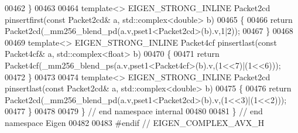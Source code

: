 \begin{DoxyCode}
00462 \}
00463 
00464 \textcolor{keyword}{template}<> EIGEN\_STRONG\_INLINE Packet2cd pinsertfirst(\textcolor{keyword}{const} Packet2cd& a, std::complex<double> b)
00465 \{
00466   \textcolor{keywordflow}{return} Packet2cd(\_mm256\_blend\_pd(a.v,pset1<Packet2cd>(b).v,1|2));
00467 \}
00468 
00469 \textcolor{keyword}{template}<> EIGEN\_STRONG\_INLINE Packet4cf pinsertlast(\textcolor{keyword}{const} Packet4cf& a, std::complex<float> b)
00470 \{
00471   \textcolor{keywordflow}{return} Packet4cf(\_mm256\_blend\_ps(a.v,pset1<Packet4cf>(b).v,(1<<7)|(1<<6)));
00472 \}
00473 
00474 \textcolor{keyword}{template}<> EIGEN\_STRONG\_INLINE Packet2cd pinsertlast(\textcolor{keyword}{const} Packet2cd& a, std::complex<double> b)
00475 \{
00476   \textcolor{keywordflow}{return} Packet2cd(\_mm256\_blend\_pd(a.v,pset1<Packet2cd>(b).v,(1<<3)|(1<<2)));
00477 \}
00478 
00479 \} \textcolor{comment}{// end namespace internal}
00480 
00481 \} \textcolor{comment}{// end namespace Eigen}
00482 
00483 \textcolor{preprocessor}{#endif // EIGEN\_COMPLEX\_AVX\_H}
\end{DoxyCode}
